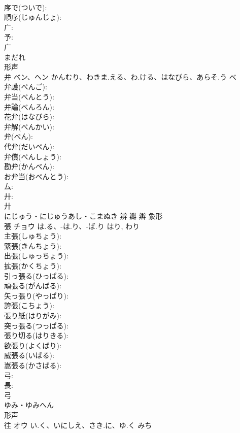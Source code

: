 \documentclass[8pt]{extreport}
\begin{document}
\begin{CJK}{UTF8}{min}
\\	序で(ついで): 
\\	順序(じゅんじょ): 
\\	广: 
\\	予: 
\\	广	
\\	まだれ	
\\	形声 
\\	弁	ベン、ヘン	かんむり、わきま.える、わ.ける、はなびら、あらそ.う	べ	
\\	弁護(べんご): 
\\	弁当(べんとう): 
\\	弁論(べんろん): 
\\	花弁(はなびら): 
\\	弁解(べんかい): 
\\	弁(べん): 
\\	代弁(だいべん): 
\\	弁償(べんしょう): 
\\	勘弁(かんべん): 
\\	お弁当(おべんとう): 
\\	厶: 
\\	廾: 
\\	廾	
\\	にじゅう・にじゅうあし・こまぬき	辨 瓣 辯	象形 
\\	張	チョウ	は.る、-は.り、-ば.り	はり, わり	
\\	主張(しゅちょう): 
\\	緊張(きんちょう): 
\\	出張(しゅっちょう): 
\\	拡張(かくちょう): 
\\	引っ張る(ひっぱる): 
\\	頑張る(がんばる): 
\\	矢っ張り(やっぱり): 
\\	誇張(こちょう): 
\\	張り紙(はりがみ): 
\\	突っ張る(つっぱる): 
\\	張り切る(はりきる): 
\\	欲張り(よくばり): 
\\	威張る(いばる): 
\\	嵩張る(かさばる): 
\\	弓: 
\\	長: 
\\	弓	
\\	ゆみ・ゆみへん	
\\	形声 
\\	往	オウ	い.く、いにしえ、さき.に、ゆ.く	みち	

\end{CJK}
\end{document}
